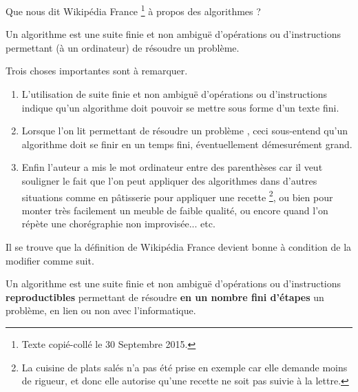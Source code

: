 Que nous dit Wikipédia France
\footnote{
    Texte copié-collé le 30 Septembre 2015.
}
à propos des algorithmes ?

\vspace{-0.3em}

\begin{Quote}[author = Wikipédia]
    Un algorithme est une suite finie et non ambiguë d’opérations ou d'instructions permettant (à un ordinateur) de résoudre un problème.
\end{Quote}

\vspace{-0.3em}

Trois choses importantes sont à remarquer.
\begin{enumerate}
    \item L'utilisation de \og suite finie et non ambiguë d’opérations ou d'instructions \fg{} indique qu'un algorithme doit pouvoir se mettre sous forme d'un texte fini.

    \item Lorsque l'on lit \og permettant de résoudre un problème \fg{}, ceci sous-entend qu'un algorithme doit se finir en un temps fini, éventuellement démesurément grand.

    \item Enfin l'auteur a mis le mot \og ordinateur \fg entre des parenthèses car il veut souligner le fait que l'on peut appliquer des algorithmes dans d'autres situations comme en pâtisserie pour appliquer une recette
\footnote{
    La cuisine de plats salés n'a pas été prise en exemple car elle demande moins de rigueur, et donc elle autorise qu'une recette ne soit pas suivie à la lettre.
},
ou bien pour monter très facilement un meuble de faible qualité, ou encore quand l'on répète une chorégraphie non improvisée... etc.
\end{enumerate}

\medskip

Il se trouve que la définition de Wikipédia France devient bonne à condition de la modifier comme suit.

\vspace{-0.3em}

\begin{Quote}
    Un algorithme est une suite finie et non ambiguë d’opérations ou d'instructions \textbf{reproductibles} permettant de résoudre \textbf{en un nombre fini d'étapes} un problème, en lien ou non avec l'informatique.
\end{Quote}

\vspace{-0.3em}

